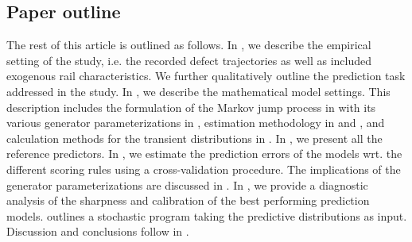 \subsection{Paper outline}
The rest of this article is outlined as follows. In , we describe the empirical setting of the study, i.e. the recorded defect trajectories as well as included exogenous rail characteristics. We further qualitatively outline the prediction task addressed in the study. In , we describe the mathematical model settings. This description includes the formulation of the Markov jump process in  with its various generator parameterizations in , estimation methodology in  and , and calculation methods for the transient distributions in . In , we present all the reference predictors. In , we estimate the prediction errors of the models wrt. the different scoring rules using a cross-validation procedure. The implications of the generator parameterizations are discussed in . In , we provide a diagnostic analysis of the sharpness and calibration of the best performing prediction models.  outlines a stochastic program taking the predictive distributions as input. Discussion and conclusions follow in . 